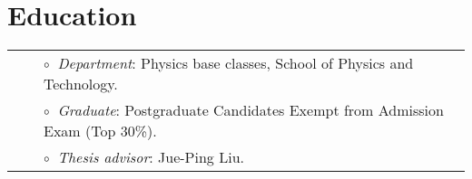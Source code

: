 \documentclass[letterpaper]{moderncv}
\begin{document}



\section{Education}



\vspace{0.2cm}
\vspace{-0.1cm}
\begin{tabular}{rcl}
&\hspace{0.4cm} &$\circ\;\;${\textit{Department}}: Physics base classes,  School of Physics and Technology.\\
&\hspace{0.4cm} &$\circ\;\;${\textit{Graduate}}: Postgraduate Candidates Exempt from Admission Exam (Top 30\%).\\
&\hspace{0.4cm} &$\circ\;\;${\textit{Thesis advisor}}:  Jue-Ping Liu.\\
\end{tabular}
\end{document}
